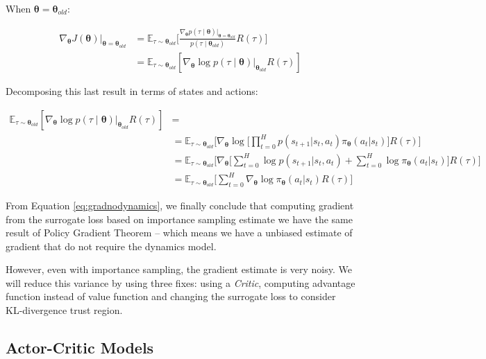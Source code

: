 When $\boldsymbol{\theta} = \boldsymbol{\theta}_{old}$:

\begin{align}
\nabla_{\boldsymbol{\theta}} J(\boldsymbol{\theta}) |_{\boldsymbol{\theta} = \boldsymbol{\theta}_{old}} &= \mathbb{E}_{\tau \sim \boldsymbol{\theta}_{old}} \Bigg[\frac{\nabla_{\boldsymbol{\theta}} p(\tau \mid \boldsymbol{\theta})|_{\boldsymbol{\theta} = \boldsymbol{\theta}_{old}}}{p(\tau \mid \boldsymbol{\theta}_{old})}R(\tau) \Bigg] \\
&= \mathbb{E}_{\tau \sim \boldsymbol{\theta}_{old}} [\nabla_{\boldsymbol{\theta}} \log p(\tau \mid \boldsymbol{\theta} ) |_{\boldsymbol{\theta}_{old}}R(\tau)]
\end{align} 

Decomposing this last result in terms of states and actions:

\begin{align}
\mathbb{E}_{\tau \sim \boldsymbol{\theta}_{old}} [\nabla_{\boldsymbol{\theta}} \log p(\tau \mid \boldsymbol{\theta} ) |_{\boldsymbol{\theta}_{old}}R(\tau)] &= \\
&=  \mathbb{E}_{\tau \sim \boldsymbol{\theta}_{old}} \Bigg[\nabla_{\boldsymbol{\theta}} \log \Big[ \prod_{t = 0}^{H}p(s_{t+1}|s_{t}, a_{t})\pi_{\boldsymbol{\theta}}(a_{t}|s_{t})\Big] R(\tau) \Bigg] \\
&= \mathbb{E}_{\tau \sim \boldsymbol{\theta}_{old}} \Bigg[ \nabla_{\boldsymbol{\theta}} \Big[ \sum_{t=0}^{H} \log p(s_{t+1}|s_{t}, a_{t}) + \sum_{t = 0}^{H} \log \pi_{\boldsymbol{\theta}}(a_{t}|s_{t}) \Big] R(\tau) \Bigg] \\
&= \mathbb{E}_{\tau \sim \boldsymbol{\theta}_{old}} \Bigg[ \sum_{t=0}^{H} \nabla_{\boldsymbol{\theta}} \log \pi_{\boldsymbol{\theta}} (a_{t}|s_{t}) R(\tau) \Bigg] \label{eq:gradnodynamics}
\end{align}

From Equation \ref{eq:gradnodynamics}, we finally conclude that computing gradient from the surrogate loss based on importance sampling estimate we have the same result of Policy Gradient Theorem -- which means we have a unbiased estimate of gradient that do not require the dynamics model.

However, even with importance sampling, the gradient estimate is very noisy. We will reduce this variance by using three fixes: using a \textit{Critic}, computing advantage function instead of value function and changing the surrogate loss to consider KL-divergence trust region. 

\subsection{Actor-Critic Models}

